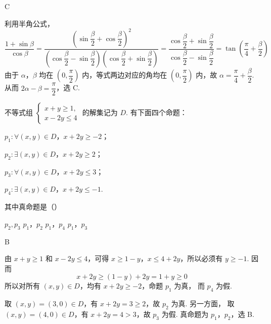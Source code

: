 \begin{answer}
C
\end{answer}

\begin{solution}
利用半角公式，
\[
\frac{1+\sin\beta}{\cos\beta}
 =\frac{\left(\sin\dfrac\beta2+\cos\dfrac\beta2\right)^2}
 {\left(\cos\dfrac\beta2-\sin\dfrac\beta2\right)
  \left(\cos\dfrac\beta2+\sin\dfrac\beta2\right)}
 =\frac{\cos\dfrac\beta2+\sin\dfrac\beta2}
 {\cos\dfrac\beta2-\sin\dfrac\beta2}
 =\tan\left(\frac\pi4+\frac\beta2\right)
\]
由于 \(\alpha\)，\(\beta\) 均在 \(\left(0,\dfrac\pi2\right)\) 内，等式两边对应的角均在
\(\left(0,\dfrac\pi2\right)\) 内，故
\(\alpha=\dfrac\pi4+\dfrac\beta2\). 从而
\(2\alpha-\beta=\dfrac\pi2\)，选 C.
\end{solution}

\begin{problem}
不等式组 \(\begin{cases}
x + y \geqslant 1,\\
x - 2y \leqslant 4
\end{cases}\) 的解集记为 \(D\). 有下面四个命题：

\begin{circlelist}
\item \(p_1\colon \forall (x,y)\in D\)，\(x + 2y\geqslant -2\)；
\item \(p_2\colon \exists (x,y)\in D\)，\(x + 2y\geqslant 2\)；
\item \(p_3\colon \forall (x,y)\in D\)，\(x + 2y\leqslant 3\)；
\item \(p_4\colon \exists (x,y)\in D\)，\(x + 2y\leqslant -1\).
\end{circlelist}

其中真命题是（\quad）

\choices
    {\(p_2, p_3\)}
    {\(p_1\)，\(p_2\)}
    {\(p_1\)，\(p_4\)}
    {\(p_1\)，\(p_3\)}
\end{problem}

\begin{answer}
B
\end{answer}

\begin{solution}
由 \(x+y\geqslant1\) 和 \(x-2y\leqslant4\)，可得
\(x\geqslant1-y\)，\(x\leqslant4+2y\)，所以必须有 \(y\geqslant-1\). 因而
\[
x+2y\geqslant(1-y)+2y=1+y\geqslant0
\]
所以对所有 \((x,y)\in D\)，均有 \(x+2y\geqslant-2\)，命题 \(p_1\) 为真，
而 \(p_4\) 为假.

取 \((x,y)=(3,0)\in D\)，有 \(x+2y=3\geqslant2\)，故 \(p_2\) 为真. 另一方面，
取 \((x,y)=(4,0)\in D\)，有 \(x+2y=4>3\)，故 \(p_3\) 为假. 真命题为
\(p_1\)，\(p_2\)，选 B.
\end{solution}

